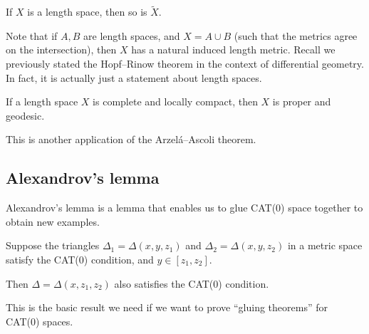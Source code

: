 \documentclass[a4paper]{article}
\begin{document}
\begin{ex}
  If $X$ is a length space, then so is $\tilde{X}$.
\end{ex}

Note that if $A, B$ are length spaces, and $X = A \cup B$ (such that the metrics agree on the intersection), then $X$ has a natural induced length metric. Recall we previously stated the Hopf--Rinow theorem in the context of differential geometry. In fact, it is actually just a statement about length spaces.

\begin{thm}
  If a length space $X$ is complete and locally compact, then $X$ is proper and geodesic.
\end{thm}
This is another application of the Arzel\'a--Ascoli theorem.

\subsection{Alexandrov's lemma}
Alexandrov's lemma is a lemma that enables us to glue CAT(0) space together to obtain new examples.

\begin{lemma}
  Suppose the triangles $\Delta_1 = \Delta(x, y, z_1)$ and $\Delta_2 = \Delta(x, y, z_2)$ in a metric space satisfy the CAT(0) condition, and $y \in [z_1, z_2]$.
  \begin{center}
  \end{center}
  Then $\Delta = \Delta(x, z_1, z_2)$ also satisfies the CAT(0) condition.
\end{lemma}
This is the basic result we need if we want to prove ``gluing theorems'' for CAT(0) spaces.
\end{document}
